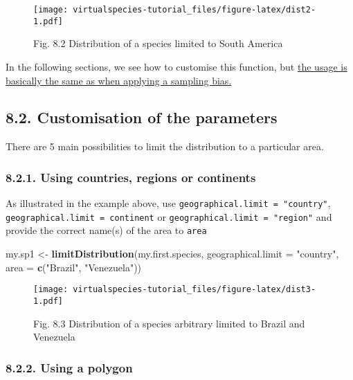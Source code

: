 \documentclass[]{article}
\newenvironment{Shaded}{\begin{snugshade}}{\end{snugshade}}
\newcommand{\KeywordTok}[1]{\textcolor[rgb]{0.13,0.29,0.53}{\textbf{#1}}}
\newcommand{\DataTypeTok}[1]{\textcolor[rgb]{0.13,0.29,0.53}{#1}}
\newcommand{\StringTok}[1]{\textcolor[rgb]{0.31,0.60,0.02}{#1}}
\newcommand{\NormalTok}[1]{#1}
\begin{document}
\begin{figure}
\centering
\texttt{[image: virtualspecies-tutorial\_files/figure-latex/dist2-1.pdf]}
\caption{Fig. 8.2 Distribution of a species limited to South America}
\end{figure}

In the following sections, we see how to customise this function, but
\protect\hyperlink{uneven-sampling-intensity}{the usage is basically the
same as when applying a sampling bias.}

\subsection{8.2. Customisation of the
parameters}\label{customisation-of-the-parameters-1}

There are 5 main possibilities to limit the distribution to a particular
area.

\subsubsection{8.2.1. Using countries, regions or
continents}\label{using-countries-regions-or-continents}

As illustrated in the example above, use
\texttt{geographical.limit\ =\ "country"},
\texttt{geographical.limit\ =\ continent} or
\texttt{geographical.limit\ =\ "region"} and provide the correct name(s)
of the area to \texttt{area}

\begin{Shaded}
\begin{Highlighting}[]
\NormalTok{my.sp1 <-}\StringTok{ }\KeywordTok{limitDistribution}\NormalTok{(my.first.species, }
                            \DataTypeTok{geographical.limit =} \StringTok{"country"}\NormalTok{,}
                            \DataTypeTok{area =} \KeywordTok{c}\NormalTok{(}\StringTok{"Brazil"}\NormalTok{, }\StringTok{"Venezuela"}\NormalTok{))}
\end{Highlighting}
\end{Shaded}

\begin{figure}
\centering
\texttt{[image: virtualspecies-tutorial\_files/figure-latex/dist3-1.pdf]}
\caption{Fig. 8.3 Distribution of a species arbitrary limited to Brazil
and Venezuela}
\end{figure}

\subsubsection{8.2.2. Using a polygon}\label{using-a-polygon}
\end{document}
